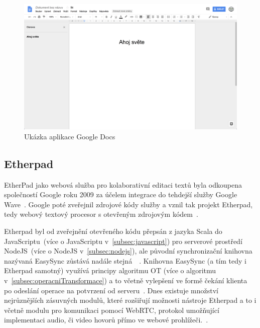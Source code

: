 \begin{figure}[ht]
    \centering
    \includegraphics[width=\textwidth]{partials/analyza/googleDocs}
    \caption{Ukázka aplikace Google Docs}\label{fig:googleDocs}
\end{figure}

\subsection{Etherpad}\label{subsec:etherpad}

EtherPad jako webová služba pro kolaborativní editaci textů byla odkoupena společností Google roku 2009 za účelem integrace do tehdejší služby Google Wave~\cite{etherpad:acquired}.
Google poté zveřejnil zdrojové kódy služby a vznil tak projekt Etherpad, tedy webový textový procesor s otevřeným zdrojovým kódem~\cite{etherpad:openSource}.

Etherpad byl od zveřejnění otevřeného kódu přepsán z jazyka Scala do JavaScriptu~(více o JavaScriptu v~\ref{subsec:javascript}) pro serverové prostředí NodeJS~(více o NodeJS v~\ref{subsec:nodejs}), ale původní synchronizační knihovna nazývaná EasySync zůstává nadále stejná~\cite{etherpad:newgithub}~\cite{etherpad:easySync}.
Knihovna EasySync (a tím tedy i Etherpad samotný) využívá principy algoritmu \gls{OT} (více o algoritmu v~\ref{subsec:operacniTransformace}) a to včetně vylepšení ve formě čekání klienta po odeslání operace na potvrzení od serveru~\cite{etherpad:easySync}.
Dnes existuje množství nejrůznějších zásuvných modulů, které rozšiřují možnosti nástroje Etherpad a to i včetně modulu pro komunikaci pomocí \gls{WebRTC}, protokol umožňující implementaci audio, či video hovorů přímo ve webové prohlížeči.~\cite{etherpad:plugins}.

